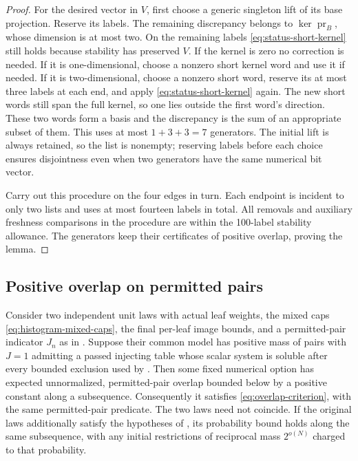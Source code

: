 \begin{proof}
For the desired vector in $V$, first choose a generic singleton lift
of its base projection. Reserve its labels. The remaining discrepancy
belongs to $\ker\operatorname{pr}_B$, whose dimension is at most two. On the remaining
labels \eqref{eq:status-short-kernel} still holds because stability has
preserved $V$. If the kernel is zero no correction is needed. If it is
one-dimensional, choose a nonzero short kernel word and use it if
needed. If it is two-dimensional, choose a nonzero short word, reserve
its at most three labels at each end, and apply
\eqref{eq:status-short-kernel} again. The new short words still span
the full kernel, so one lies outside the first word's direction.
These two words form a basis and the discrepancy is the sum of an
appropriate subset of them. This uses at most
$1+3+3=7$ generators. The initial lift is always retained, so the list
is nonempty; reserving labels before each choice ensures disjointness
even when two generators have the same numerical bit vector.

Carry out this procedure on the four edges in turn. Each endpoint is
incident to only two lists and uses at most fourteen labels in total.
All removals and auxiliary freshness comparisons in the procedure are
within the 100-label stability allowance. The generators keep their
certificates of positive overlap, proving the lemma.
\end{proof}

\subsection{Positive overlap on permitted pairs}

\begin{proposition}
\label{prop:positive-overlap}
Consider two independent unit laws with actual leaf weights, the mixed
caps \eqref{eq:histogram-mixed-caps}, the final per-leaf image bounds,
and a permitted-pair indicator $J_n$ as in .
Suppose their common model has positive mass of pairs with $J=1$
admitting a passed injecting table whose scalar system is soluble after
every bounded exclusion used by . Then some fixed
numerical option has expected unnormalized, permitted-pair overlap
bounded below by a positive constant along a subsequence. Consequently
it satisfies \eqref{eq:overlap-criterion}, with the same permitted-pair
predicate. The two laws need not coincide. If the original laws
additionally satisfy the hypotheses of , its
probability bound holds along the same subsequence, with any initial
restrictions of reciprocal mass $2^{o(N)}$ charged to that probability.
\end{proposition}

